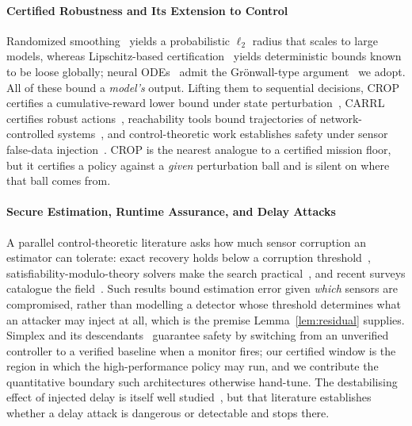 \paragraph{Certified Robustness and Its Extension to Control}
Randomized smoothing~\cite{cohen2019smoothing,salman2019provably} yields a
probabilistic $\ell_2$ radius that scales to large models, whereas
Lipschitz-based certification~\cite{pauli2022training,zhang2022rethinking}
yields deterministic bounds known to be loose globally; neural
ODEs~\cite{chen2018neuralode} admit the Gr\"onwall-type
argument~\cite{yan2020robustnode} we adopt. All of these bound a \emph{model's}
output. Lifting them to sequential decisions, CROP certifies a cumulative-reward
lower bound under state perturbation~\cite{wu2022crop}, CARRL certifies robust
actions~\cite{everett2021carrl}, reachability tools bound trajectories of
network-controlled systems~\cite{ivanov2019verisig,tran2020nnv}, and
control-theoretic work establishes safety under sensor false-data
injection~\cite{li2022lqg}. CROP is the nearest analogue to a certified mission
floor, but it certifies a policy against a \emph{given} perturbation ball and is
silent on where that ball comes from.

\paragraph{Secure Estimation, Runtime Assurance, and Delay Attacks}
A parallel control-theoretic literature asks how much sensor corruption an
estimator can tolerate: exact recovery holds below a corruption
threshold~\cite{fawzi2014secure}, satisfiability-modulo-theory solvers make the
search practical~\cite{shoukry2017smt}, and recent surveys catalogue the
field~\cite{ding2021survey}. Such results bound estimation error given
\emph{which} sensors are compromised, rather than modelling a detector whose
threshold determines what an attacker may inject at all, which is the premise
Lemma~\ref{lem:residual} supplies. Simplex and its
descendants~\cite{sha2001simplex,mehmood2022blackbox,cofer2020rta} guarantee
safety by switching from an unverified controller to a verified baseline when a
monitor fires; our certified window is the region in which the high-performance
policy may run, and we contribute the quantitative boundary such architectures
otherwise hand-tune. The destabilising effect of injected delay is itself well
studied~\cite{lou2019timedelay,etd2023uav,datamut2026}, but that literature
establishes whether a delay attack is dangerous or detectable and stops there.

